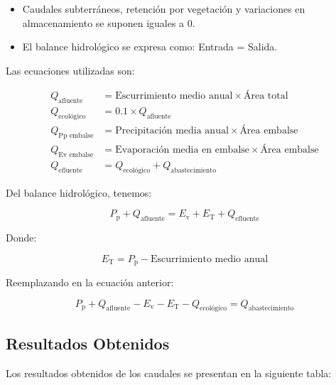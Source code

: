 \documentclass{article} %
\begin{document}
\begin{itemize}
    \item Caudales subterráneos, retención por vegetación y variaciones en almacenamiento se suponen iguales a 0.
    \item El balance hidrológico se expresa como: Entrada = Salida.
\end{itemize}

Las ecuaciones utilizadas son:

\begin{align}
    Q_{\text{afluente}} &= \text{Escurrimiento medio anual} \times \text{Área total} \\
    Q_{\text{ecológico}} &= 0.1 \times Q_{\text{afluente}} \\
    Q_{\text{Pp embalse}} &= \text{Precipitación media anual} \times \text{Área embalse} \\
    Q_{\text{Ev embalse}} &= \text{Evaporación media en embalse} \times \text{Área embalse} \\
    Q_{\text{efluente}} &= Q_{\text{ecológico}} + Q_{\text{abastecimiento}}
\end{align}

Del balance hidrológico, tenemos:

\begin{equation}
    P_{\text{p}} + Q_{\text{afluente}} = E_{\text{v}} + E_{\text{T}} + Q_{\text{efluente}}
\end{equation}

Donde:

\begin{equation}
    E_{\text{T}} = P_{\text{p}} - \text{Escurrimiento medio anual}
\end{equation}

Reemplazando en la ecuación anterior:

\begin{equation}
    P_{\text{p}} + Q_{\text{afluente}} - E_{\text{v}} - E_{\text{T}} - Q_{\text{ecológico}} = Q_{\text{abastecimiento}}
\end{equation}

\newpage
\subsection{Resultados Obtenidos}

Los resultados obtenidos de los caudales se presentan en la siguiente tabla:
\end{document}
